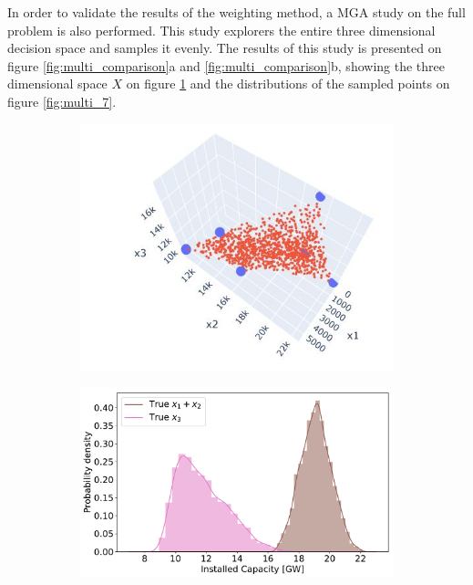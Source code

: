 In order to validate the results of the weighting method, a MGA study on the full problem is also performed. This study explorers the entire three dimensional decision space and samples it evenly.
The results of this study is presented on figure \ref{fig:multi_comparison}a and \ref{fig:multi_comparison}b, showing the three dimensional space $X$ on figure \ref{fig:multi_6} and the distributions of the sampled points on figure \ref{fig:multi_7}.  

\begin{figure}[h]\centering
	\begin{subfigure}{.5\textwidth} \centering
		\includegraphics[width=1.\textwidth]{./Images/multi_6}
		\caption{}
		\label{fig:multi_6}
	\end{subfigure}%
	\begin{subfigure}{.5\textwidth} \centering
		\includegraphics[width=1.\textwidth]{./Images/multi_7}

\end{subfigure}
\end{figure}
